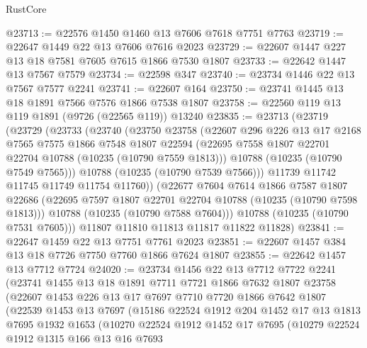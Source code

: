 \begin{lexlean}{RustCore}
\begin{coremodule}
@23713 := @22576 @1450 @1460 @13 @7606 @7618 @7751 @7763
@23719 := @22647 @1449 @22 @13 @7606 @7616 @2023
@23729 := @22607 @1447 @227 @13 @18 @7581 @7605 @7615 @1866 @7530 @1807
@23733 := @22642 @1447 @13 @7567 @7579
@23734 := @22598 @347
@23740 := @23734 @1446 @22 @13 @7567 @7577 @2241
@23741 := @22607 @164
@23750 := @23741 @1445 @13 @18 @1891 @7566 @7576 @1866 @7538 @1807
@23758 := @22560 @119 @13 @119 @1891 (@9726 (@22565 @119)) @13240
@23835 := @23713
    (@23719
      (@23729
        (@23733
          (@23740
            (@23750
              @23758
              (@22607
                @296
                @226
                @13
                @17
                @2168
                @7565
                @7575
                @1866
                @7548
                @1807
                @22594
                (@22695 @7558 @1807 @22701 @22704 @10788 (@10235 (@10790 @7559 @1813)))
                @10788
                (@10235 (@10790 @7549 @7565)))
              @10788
              (@10235 (@10790 @7539 @7566)))
            @11739
            @11742
            @11745
            @11749
            @11754
            @11760))
        (@22677
          @7604
          @7614
          @1866
          @7587
          @1807
          @22686
          (@22695 @7597 @1807 @22701 @22704 @10788 (@10235 (@10790 @7598 @1813)))
          @10788
          (@10235 (@10790 @7588 @7604)))
        @10788
        (@10235 (@10790 @7531 @7605)))
      @11807
      @11810
      @11813
      @11817
      @11822
      @11828)
@23841 := @22647 @1459 @22 @13 @7751 @7761 @2023
@23851 := @22607 @1457 @384 @13 @18 @7726 @7750 @7760 @1866 @7624 @1807
@23855 := @22642 @1457 @13 @7712 @7724
@24020 := @23734
    @1456
    @22
    @13
    @7712
    @7722
    @2241
    (@23741
      @1455
      @13
      @18
      @1891
      @7711
      @7721
      @1866
      @7632
      @1807
      @23758
      (@22607
        @1453
        @226
        @13
        @17
        @7697
        @7710
        @7720
        @1866
        @7642
        @1807
        (@22539
          @1453
          @13
          @7697
          (@15186
            @22524
            @1912
            @204
            @1452
            @17
            @13
            @1813
            @7695
            @1932
            @1653
            (@10270
              @22524
              @1912
              @1452
              @17
              @7695
              (@10279
                @22524
                @1912
                @1315
                @166
                @13
                @16
                @7693

\end{coremodule}
\end{lexlean}

